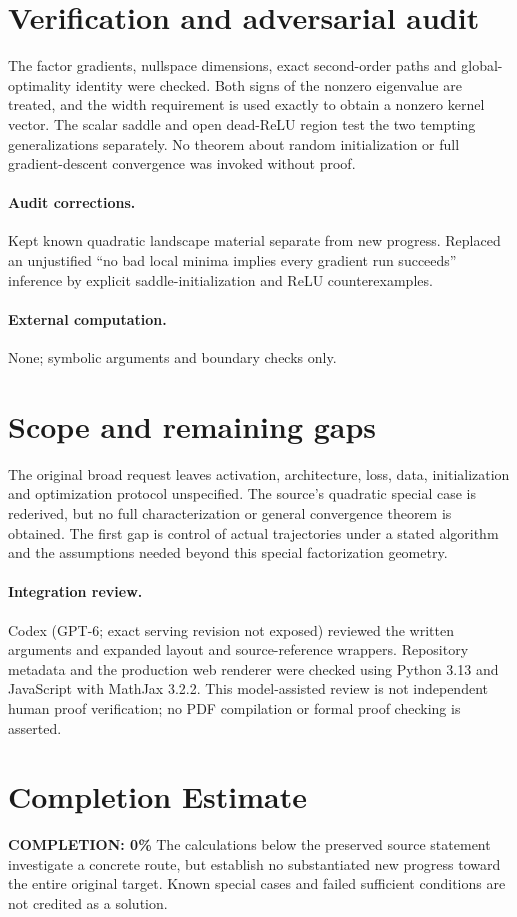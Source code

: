 \documentclass[11pt]{article}
\begin{document}
\section{Verification and adversarial audit}
The factor gradients, nullspace dimensions, exact second-order paths and global-optimality identity were checked. Both signs of the nonzero eigenvalue are treated, and the width requirement is used exactly to obtain a nonzero kernel vector. The scalar saddle and open dead-ReLU region test the two tempting generalizations separately. No theorem about random initialization or full gradient-descent convergence was invoked without proof.
\paragraph{Audit corrections.} Kept known quadratic landscape material separate from new progress. Replaced an unjustified ``no bad local minima implies every gradient run succeeds'' inference by explicit saddle-initialization and ReLU counterexamples.
\paragraph{External computation.} None; symbolic arguments and boundary checks only.
\section{Scope and remaining gaps}
The original broad request leaves activation, architecture, loss, data, initialization and optimization protocol unspecified. The source's quadratic special case is rederived, but no full characterization or general convergence theorem is obtained. The first gap is control of actual trajectories under a stated algorithm and the assumptions needed beyond this special factorization geometry.
\paragraph{Integration review.} Codex (GPT-6; exact serving revision not exposed) reviewed the written arguments and expanded layout and source-reference wrappers. Repository metadata and the production web renderer were checked using Python 3.13 and JavaScript with MathJax 3.2.2. This model-assisted review is not independent human proof verification; no PDF compilation or formal proof checking is asserted.

\section{Completion Estimate}
\noindent\textbf{COMPLETION: 0\%}
The calculations below the preserved source statement investigate a concrete route,
but establish no substantiated new progress toward the entire original target.
Known special cases and failed sufficient conditions are not credited as a solution.
\end{document}
